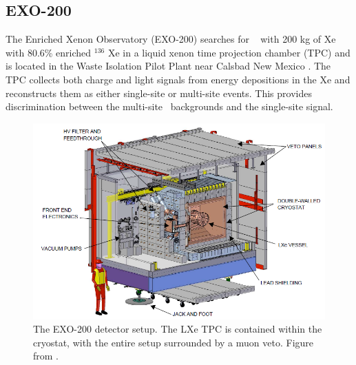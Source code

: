 \subsection{EXO-200}
The Enriched Xenon Observatory (EXO-200) searches for \zeronubb~ with 200 kg of Xe with 80.6\% enriched $^{136}$ Xe in a liquid xenon time projection chamber (TPC) and is located in the Waste Isolation Pilot Plant near Calsbad New Mexico \cite{Albert:2017owj}.
The TPC collects both charge and light signals from energy depositions in the Xe and reconstructs them as either single-site or multi-site events.
This provides discrimination between the multi-site \gamma~backgrounds and the single-site signal.
\begin{figure}[htbp]
    \centering
    \includegraphics[width=0.7\linewidth]{Figures/EXO.png}
    \caption[The EXO-200 detector setup.]
    {The EXO-200 detector setup.
    The LXe TPC is contained within the cryostat, with the entire setup surrounded by a muon veto.
    Figure from \cite{Auger:2012gs}.}
    \label{fig:EXO}
\end{figure}


